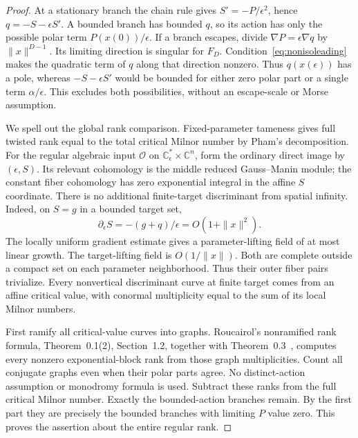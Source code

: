 \documentclass[11pt]{article}
\theoremstyle{definition}\newtheorem{definition}[theorem]{Definition}
\theoremstyle{remark}\newtheorem{remark}[theorem]{Remark}
\newcommand{\C}{\mathbb C}
\begin{document}
\begin{proof}
At a stationary branch the chain rule gives
$S'=-P/\epsilon^2$, hence $q=-S-\epsilon S'$.
A bounded branch has bounded $q$, so its action has only the
possible polar term $P(x(0))/\epsilon$. If a branch escapes,
divide $\nabla P=\epsilon\nabla q$ by $\|x\|^{D-1}$.
Its limiting direction is singular for $F_D$.
Condition~\eqref{eq:nonisoleading} makes the quadratic term of
$q$ along that direction nonzero. Thus $q(x(\epsilon))$ has a
pole, whereas $-S-\epsilon S'$ would be bounded for either zero
polar part or a single term $\alpha/\epsilon$. This excludes
both possibilities, without an escape-scale or Morse assumption.

We spell out the global rank comparison. Fixed-parameter tameness
gives full twisted rank equal to the total critical Milnor number
by Pham's decomposition. For the regular algebraic input
$\mathcal O$ on $\C^*_{\epsilon}\times\C^n$, form the ordinary
direct image by $(\epsilon,S)$. Its relevant cohomology is the
middle reduced Gauss--Manin module; the constant fiber cohomology
has zero exponential integral in the affine $S$ coordinate.
There is no additional finite-target discriminant from spatial
infinity. Indeed, on $S=g$ in a bounded target set,
\[
 \partial_\epsilon S=-(g+q)/\epsilon=O(1+\|x\|^2).
\]
The locally uniform gradient estimate gives a parameter-lifting
field of at most linear growth. The target-lifting field is
$O(1/\|x\|)$. Both are complete outside a compact set on each
parameter neighborhood. Thus their outer fiber pairs trivialize.
Every nonvertical discriminant curve at finite target comes
from an affine critical value, with conormal multiplicity equal
to the sum of its local Milnor numbers.

First ramify all critical-value curves into graphs. Roucairol's
nonramified rank formula, Theorem~0.1(2), Section~1.2, together
with Theorem~0.3~\cite{RoucairolFormal}, computes every nonzero
exponential-block rank from those graph multiplicities. Count
all conjugate graphs even when their polar parts agree. No
distinct-action assumption or monodromy formula is used.
Subtract these ranks from the full critical Milnor number.
Exactly the bounded-action branches remain. By the first part
they are precisely the bounded branches with limiting $P$ value
zero. This proves the assertion about the entire regular rank.
\end{proof}
\end{document}
